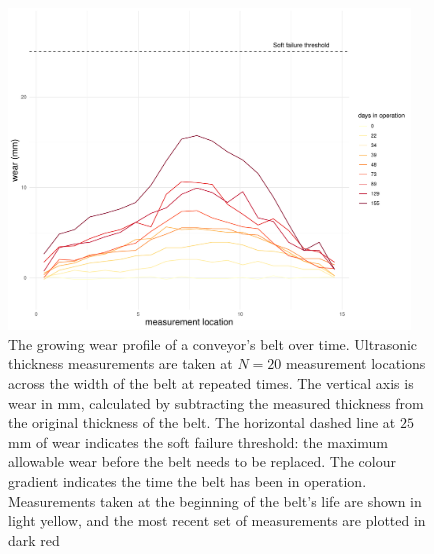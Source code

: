 \begin{figure}[tbp]
  \centering
  \includegraphics[width=0.95\textwidth]{figures/ch-6/main_belt.pdf}
  \caption{The growing wear profile of a conveyor's belt over time. Ultrasonic thickness measurements are taken at $N = 20$ measurement locations across the width of the belt at repeated times. The vertical axis is wear in mm, calculated by subtracting the measured thickness from the original thickness of the belt. The horizontal dashed line at $25$mm of wear indicates the soft failure threshold: the maximum allowable wear before the belt needs to be replaced. The colour gradient indicates the time the belt has been in operation. Measurements taken at the beginning of the belt's life are shown in light yellow, and the most recent set of measurements are plotted in dark red}
  \label{fig:ut-example}
\end{figure}

